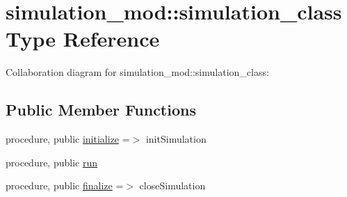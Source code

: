 \hypertarget{structsimulation__mod_1_1simulation__class}{}\section{simulation\+\_\+mod\+:\+:simulation\+\_\+class Type Reference}
\label{structsimulation__mod_1_1simulation__class}


Collaboration diagram for simulation\+\_\+mod\+:\+:simulation\+\_\+class\+:
\subsection*{Public Member Functions}
\begin{DoxyCompactItemize}
\item 
procedure, public \mbox{\hyperlink{structsimulation__mod_1_1simulation__class_aa66177f314198046f3e05d9a0a322a22}{initialize}} =$>$ init\+Simulation
\item 
procedure, public \mbox{\hyperlink{structsimulation__mod_1_1simulation__class_a47c2f9dd8a012a523ac88aa8d3c6a911}{run}}
\item 
procedure, public \mbox{\hyperlink{structsimulation__mod_1_1simulation__class_a6cc0559141483bce4e4f19ef730735df}{finalize}} =$>$ close\+Simulation
\end{DoxyCompactItemize}
